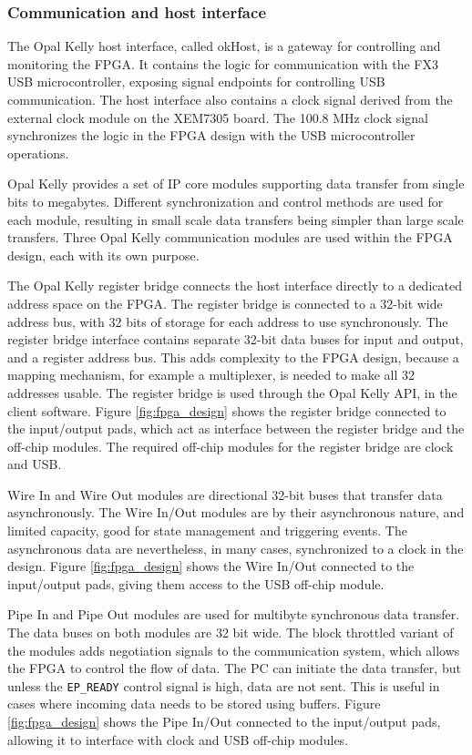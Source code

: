 \documentclass[12pt]{report}
\begin{document}
\subsubsection{Communication and host interface}
The Opal Kelly host interface, called okHost, is a gateway for controlling and monitoring the FPGA. It contains the logic for communication with the FX3 USB microcontroller, exposing signal endpoints for controlling USB communication. The host interface also contains a clock signal derived from the external clock module on the XEM7305 board. The 100.8 MHz clock signal synchronizes the logic in the FPGA design with the USB microcontroller operations. \citep{XEM7305Man} \citep{FrontPanelMan}
\par
Opal Kelly provides a set of IP core modules supporting data transfer from single bits to megabytes. Different synchronization and control methods are used for each module, resulting in small scale data transfers being simpler than large scale transfers. Three Opal Kelly communication modules are used within the FPGA design, each with its own purpose.
\par
The Opal Kelly register bridge connects the host interface directly to a dedicated address space on the FPGA. The register bridge is connected to a 32-bit wide address bus, with 32 bits of storage for each address to use synchronously. The register bridge interface contains separate 32-bit data buses for input and output, and a register address bus. This adds complexity to the FPGA design, because a mapping mechanism, for example a multiplexer, is needed to make all 32 addresses usable. The register bridge is used through the Opal Kelly API, in the client software. Figure \ref*{fig:fpga_design} shows the register bridge connected to the input/output pads, which act as interface between the register bridge and the off-chip modules. The required off-chip modules for the register bridge are clock and USB. \citep{FrontPanelMan}
\par
Wire In and Wire Out modules are directional 32-bit buses that transfer data asynchronously. The Wire In/Out modules are by their asynchronous nature, and limited capacity, good for state management and triggering events. The asynchronous data are nevertheless, in many cases, synchronized to a clock in the design. Figure \ref*{fig:fpga_design} shows the Wire In/Out connected to the input/output pads, giving them access to the USB off-chip module. \citep{FrontPanelMan}
\par
Pipe In and Pipe Out modules are used for multibyte synchronous data transfer. The data buses on both modules are 32 bit wide. The block throttled variant of the modules adds negotiation signals to the communication system, which allows the FPGA to control the flow of data. The PC can initiate the data transfer, but unless the \verb|EP_READY| control signal is high, data are not sent. This is useful in cases where incoming data needs to be stored using buffers. Figure \ref*{fig:fpga_design} shows the Pipe In/Out connected to the input/output pads, allowing it to interface with clock and USB off-chip modules. \citep{FrontPanelMan}
\end{document}
